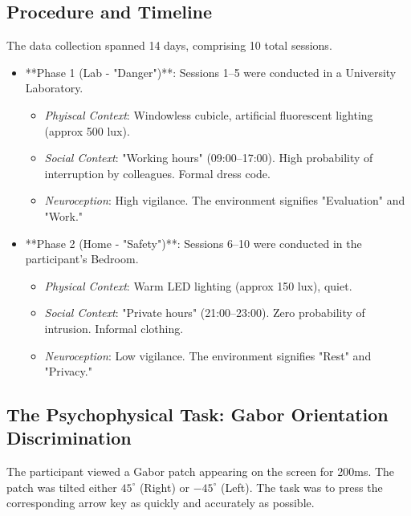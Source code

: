 \documentclass[journal]{IEEEtran}
\begin{document}
\subsection{Procedure and Timeline}
The data collection spanned 14 days, comprising 10 total sessions.
\begin{itemize}
    \item **Phase 1 (Lab - "Danger")**: Sessions 1--5 were conducted in a University Laboratory.
        \begin{itemize}
            \item \textit{Phyiscal Context}: Windowless cubicle, artificial fluorescent lighting (approx 500 lux).
            \item \textit{Social Context}: "Working hours" (09:00--17:00). High probability of interruption by colleagues. Formal dress code.
            \item \textit{Neuroception}: High vigilance. The environment signifies "Evaluation" and "Work."
        \end{itemize}
    \item **Phase 2 (Home - "Safety")**: Sessions 6--10 were conducted in the participant's Bedroom.
        \begin{itemize}
            \item \textit{Physical Context}: Warm LED lighting (approx 150 lux), quiet.
            \item \textit{Social Context}: "Private hours" (21:00--23:00). Zero probability of intrusion. Informal clothing.
            \item \textit{Neuroception}: Low vigilance. The environment signifies "Rest" and "Privacy."
        \end{itemize}
\end{itemize}

\subsection{The Psychophysical Task: Gabor Orientation Discrimination}
The participant viewed a Gabor patch appearing on the screen for 200ms. The patch was tilted either $45^\circ$ (Right) or $-45^\circ$ (Left). The task was to press the corresponding arrow key as quickly and accurately as possible.
\end{document}
